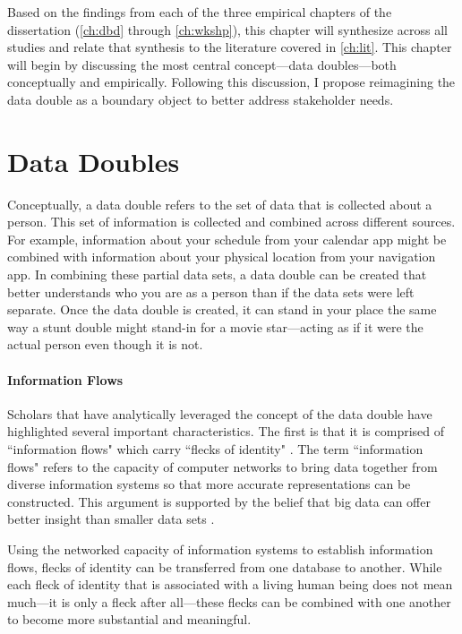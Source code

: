 Based on the findings from each of the three empirical chapters of the dissertation (\autoref{ch:dbd} through \autoref{ch:wkshp}), this chapter will synthesize across all studies and relate that synthesis to the literature covered in \autoref{ch:lit}. This chapter will begin by discussing the most central concept---data doubles---both conceptually and empirically. Following this discussion, I propose reimagining the data double as a boundary object to better address stakeholder needs.

\section{Data Doubles}
Conceptually, a data double refers to the set of data that is collected about a person. This set of information is collected and combined across different sources. For example, information about your schedule from your calendar app might be combined with information about your physical location from your navigation app. In combining these partial data sets, a data double can be created that better understands who you are as a person than if the data sets were left separate. Once the data double is created, it can stand in your place the same way a stunt double might stand-in for a movie star---acting as if it were the actual person even though it is not.

\paragraph{Information Flows}
Scholars that have analytically leveraged the concept of the data double have highlighted several important characteristics. The first is that it is comprised of ``information flows" \citep{Haggerty2006New} which carry ``flecks of identity" \citep{Fuller2005Media}. The term ``information flows" refers to the capacity of computer networks to bring data together from diverse information systems so that more accurate representations can be constructed. This argument is supported by the belief that big data can offer better insight than smaller data sets \citep{Boyd2012Critical}.

Using the networked capacity of information systems to establish information flows, flecks of identity can be transferred from one database to another. While each fleck of identity that is associated with a living human being does not mean much---it is only a fleck after all---these flecks can be combined with one another to become more substantial and meaningful.

